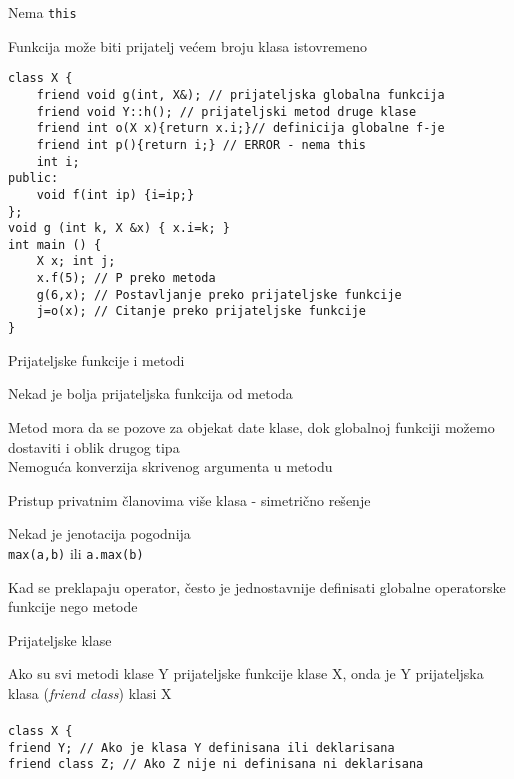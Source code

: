 \documentclass{article}
\newenvironment{xitemize}{%
    
    \itemize
    \larger
}{%
    \enditemize
}
\let\olditemize\itemize
\let\endolditemize\enditemize
\renewenvironment{itemize}{%
    \smaller
    \olditemize
}{%
    \endolditemize
}
\providecommand{\inlinecode}[1]{\texttt{#1}}
\begin{document}
\begin{xitemize}
\begin{itemize}
    \item Nema \inlinecode{this}
    \item Funkcija može biti prijatelj većem broju klasa istovremeno
    \begin{lstlisting}
class X {
    friend void g(int, X&); // prijateljska globalna funkcija
    friend void Y::h(); // prijateljski metod druge klase
    friend int o(X x){return x.i;}// definicija globalne f-je
    friend int p(){return i;} // ERROR - nema this
    int i;
public:
    void f(int ip) {i=ip;}
};
void g (int k, X &x) { x.i=k; }
int main () {
    X x; int j;
    x.f(5); // P preko metoda
    g(6,x); // Postavljanje preko prijateljske funkcije
    j=o(x); // Citanje preko prijateljske funkcije
}
    \end{lstlisting}
\end{itemize}
 \newpage
\item Prijateljske funkcije i metodi
\begin{itemize}
    \item Nekad je bolja prijateljska funkcija od metoda
    \item Metod mora da se pozove za objekat date klase, dok globalnoj funkciji možemo dostaviti i oblik drugog tipa\\
    Nemoguća konverzija skrivenog argumenta u metodu
    \item Pristup privatnim članovima više klasa - simetrično rešenje
    \item Nekad je jenotacija pogodnija\\
    \inlinecode{max(a,b)} ili \inlinecode{a.max(b)}
    \item Kad se preklapaju operator, često je jednostavnije definisati globalne operatorske funkcije nego metode
\end{itemize}
\item Prijateljske klase
\begin{itemize}
    \item Ako su svi metodi klase Y prijateljske funkcije klase X, onda je Y prijateljska klasa (\textit{friend class}) klasi X\\\\
    \inlinecode{class X \{}\\
    \hspace*{1cm}\inlinecode{friend Y; // Ako je klasa Y definisana ili deklarisana}\\
    \hspace*{1cm}\inlinecode{friend class Z; // Ako Z nije ni definisana ni deklarisana}\\

\end{itemize}
\end{xitemize}
\end{document}
